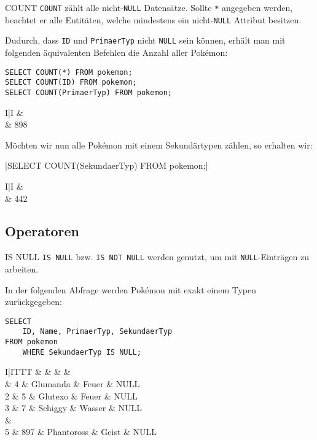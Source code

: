 \begin{sql}{COUNT}
    \texttt{COUNT} zählt alle nicht-\texttt{NULL} Datensätze.
    Sollte \texttt{*} angegeben werden, beachtet er alle Entitäten, welche mindestens ein nicht-\texttt{NULL} Attribut besitzen.

    Dudurch, dass \texttt{ID} und \texttt{PrimaerTyp} nicht \texttt{NULL} sein können, erhält man mit folgenden äquivalenten Befehlen die Anzahl aller Pokémon:

    \begin{verbatim}
SELECT COUNT(*) FROM pokemon;
SELECT COUNT(ID) FROM pokemon;
SELECT COUNT(PrimaerTyp) FROM pokemon;
    \end{verbatim}

    \begin{tabular}{I|I}
        &  \\ & 898 \\
    \end{tabular}

    Möchten wir nun alle Pokémon mit einem Sekundärtypen zählen, so erhalten wir: 

    |SELECT COUNT(SekundaerTyp) FROM pokemon;|

    \begin{tabular}{I|I}
        &  \\ & 442 \\
    \end{tabular}
\end{sql}

\subsection{Operatoren}

\begin{sql}{IS NULL}
    \texttt{IS NULL} bzw. \texttt{IS NOT NULL} werden genutzt, um mit \texttt{NULL}-Einträgen zu arbeiten.

    In der folgenden Abfrage werden Pokémon mit exakt einem Typen zurückgegeben:

    \begin{verbatim}
SELECT
    ID, Name, PrimaerTyp, SekundaerTyp
FROM pokemon
    WHERE SekundaerTyp IS NULL;
    \end{verbatim}

    \begin{tabular}{I|ITTT}
        &  &  &  &  \\ & 4 & Glumanda & Feuer & NULL \\
        2 & 5 & Glutexo & Feuer & NULL \\
        3 & 7 & Schiggy & Wasser & NULL \\
         &  \\
        5 & 897 & Phantoross & Geist & NULL \\
    \end{tabular}
\end{sql}


